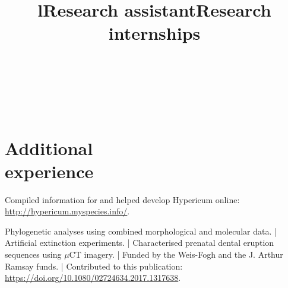 \documentclass[margin]{res}
\begin{document}
\begin{resume}

\begin{format}
\title{l}\\
\\
\body\\
\end{format}

\section{Additional\\experience}
\title{\textbf{Research assistant}}
\begin{position}
    Compiled information for and helped develop Hypericum online: \url{http://hypericum.myspecies.info/}.
\end{position}

\title{\textbf{Research internships}}
\begin{position}
    Phylogenetic analyses using combined morphological and molecular data.
    |
    Artificial extinction experiments.
    |
    Characterised prenatal dental eruption sequences using $\mu$CT imagery.
    |
    Funded by the Weis-Fogh and the J. Arthur Ramsay funds.
    |
    Contributed to this publication: \url{https://doi.org/10.1080/02724634.2017.1317638}.
\end{position}

\end{resume}
\end{document}

